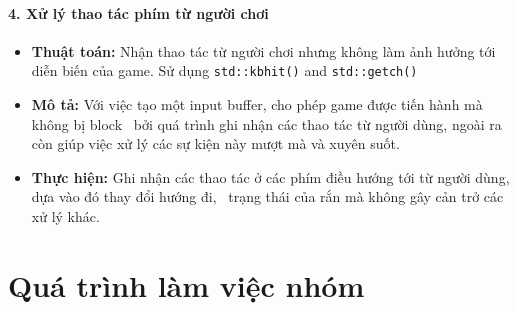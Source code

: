\documentclass[12pt]{report}
\begin{document}
\subsubsection*{4. Xử lý thao tác phím từ người chơi}
\begin{itemize}
    \item \textbf{Thuật toán:} Nhận thao tác từ người chơi nhưng không làm ảnh hưởng tới diễn biến của game. Sử dụng \texttt{std::kbhit()} and \texttt{std::getch()}
    \item \textbf{Mô tả:} Với việc tạo một input buffer, cho phép game được tiến hành mà không bị block \
          bởi quá trình ghi nhận các thao tác từ người dùng, ngoài ra còn giúp việc xử lý các sự kiện này mượt mà và xuyên suốt.
    \item \textbf{Thực hiện:} Ghi nhận các thao tác ở các phím điều hướng tới từ người dùng, dựa vào đó thay đổi hướng đi, \
          trạng thái của rắn mà không gây cản trở các xử lý khác.
\end{itemize}


\chapter{Quá trình làm việc nhóm}
\label{sec:work_process}
\end{document}

